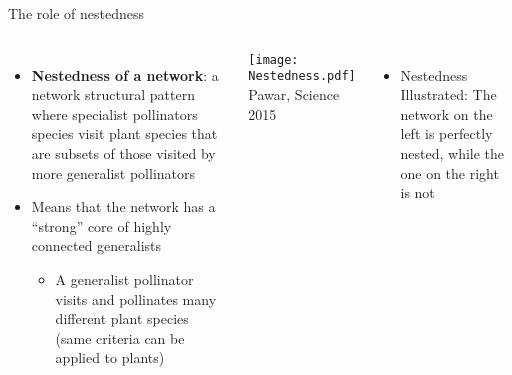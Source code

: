 \begin{frame}{The role of nestedness}

  \begin{columns}[c]
      \begin{itemize}[<+->]\setlength{\itemindent}{0em}\itemsep10pt
        \item {\bf Nestedness of a network}: a network structural pattern where specialist pollinators species visit plant species that are subsets of those visited by more generalist pollinators 
        \item Means that the network has a ``strong'' core of highly connected generalists
        \begin{itemize} 
          \item A generalist pollinator visits and pollinates many different plant species (same criteria can be applied to plants)
        \end{itemize}  
      \end{itemize}

    \centering
    \texttt{[image: Nestedness.pdf]}	\\
    {\tiny Pawar, Science 2015}
    \begin{itemize}
      \item Nestedness Illustrated: The network on the left is perfectly nested, while the one on the right is not
    \end{itemize}
  \end{columns}
\end{frame}

